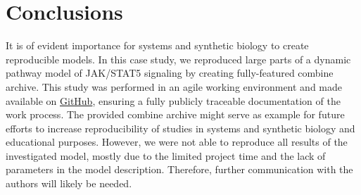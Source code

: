 \section*{Conclusions}
It is of evident importance for systems and synthetic biology to create reproducible models. In this case study, we reproduced large parts of a dynamic pathway model of JAK/STAT5 signaling \cite{bachmannmodel} by creating fully-featured \ac{combine} archive. This study was performed in an agile working environment and made available on \hyperlink{https://github.com/ahodelin/Bachmann_Archive}{GitHub}, ensuring a fully publicly traceable documentation of the work process. The provided \ac{combine} archive might serve as example for future efforts to increase reproducibility of studies in systems and synthetic biology and educational purposes. However, we were not able to reproduce all results of the investigated model, mostly due to the limited project time and the lack of parameters in the model description. Therefore, further communication with the authors will likely be needed. 
